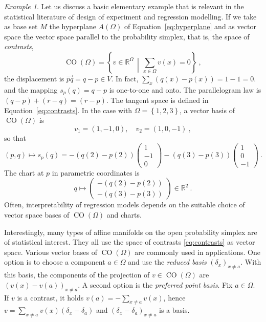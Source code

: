 \documentclass[axioms,article,submit,pdftex,moreauthors]{Definitions/mdpi}
\theoremstyle{plain}
\theoremstyle{remark}
\newtheorem{myexample}{Example}
\newcommand{\contrastson}[1]{\operatorname{CO}\left(#1\right)}
\newcommand{\reals}{\mathbb{R}}
\newcommand{\setof}[2]{\left\{#1 \, \middle| \, #2 \right\}}
\newcommand{\set}[1]{\left\{#1\right\}}
\begin{document}
\begin{myexample}
\label{ex:contrasts}
Let us discuss a basic elementary example that is relevant in the statistical literature of design of experiment and regression modelling.
If we take as base set \(M\) the hyperplane $A(\Omega)$ of Equation~\eqref{eq:hyperplane} and as vector space the vector space parallel to the probability simplex, that is, the space of \emph{contrasts},
\begin{equation} \label{eq:contrasts}
\contrastson\Omega = \setof{ v \in \reals^\Omega}{\sum_{x \in \Omega} v(x) = 0} \ ,
\end{equation}
the displacement is \(\overrightarrow{pq} = q - p \in V\). In fact, \(\sum_{x} (q(x) - p(x)) = 1 - 1 = 0\). and the mapping \(s_p(q) = q - p\) is one-to-one and onto. The parallelogram law is \((q - p) + (r - q) = (r - p)\). The tangent space is defined in Equation~\eqref{eq:contrasts}. In the case
with \(\Omega = \set{1, 2, 3}\), a vector basis of $\contrastson\Omega$ is
\begin{equation*} 
v_1 = (1, -1, 0), \quad v_2 = (1, 0, -1) \ ,
\end{equation*} 
so that
\begin{equation*} 
(p, q) \mapsto s_p(q) = -(q(2) - p(2))
\begin{pmatrix}
1 \\
-1 \\
0
\end{pmatrix}
- (q(3) - p(3))
\begin{pmatrix}
1 \\
0 \\
-1
\end{pmatrix} \ .
\end{equation*} 
The chart at $p$ in parametric coordinates is
\begin{equation*} q \mapsto 
\begin{pmatrix}-(q(2) - p(2)) \\ -(q(3) - p(3))\end{pmatrix} \in 
\reals^2 \ .
\end{equation*} 
Often, interpretability of regression models depends on the suitable choice of vector space bases of $\contrastson\Omega$ and charts.
\end{myexample}

Interestingly, many types of affine manifolds on the open probability simplex are of statistical interest. They all use the space of contrasts \eqref{eq:contrasts} as vector space. Various vector bases of $\contrastson\Omega$ are commonly used in applications. One option is to choose a component $a \in \Omega$ and use the \emph{reduced basis} $(\delta_x)_{x \neq a}$. With this basis, the components of the projection of $v \in \contrastson\Omega$ are $(v(x) - v(a))_{x \neq a}$. A second option is the \emph{preferred point basis}. Fix $a \in \Omega$. If $v$ is a contrast, it holds $v(a) = - \sum_{x \neq a} v(x)$, hence $v = \sum_{x \neq a} v(x) (\delta_x - \delta_a)$ and $(\delta_x - \delta_a)_{x \neq a}$ is a basis. 
\end{document}
